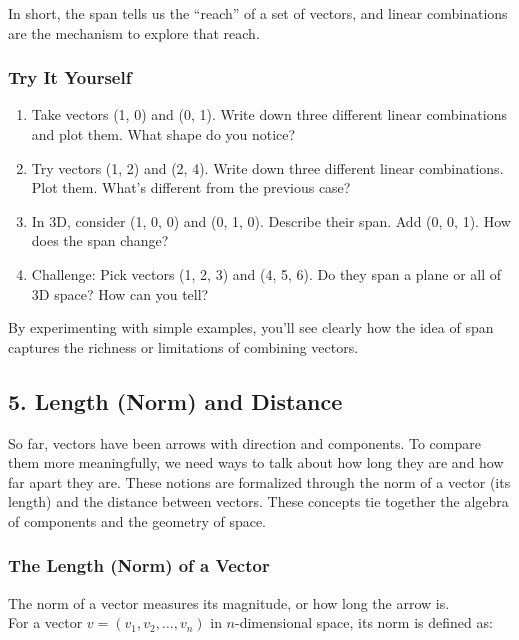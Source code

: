 \documentclass[
  letterpaper,
  DIV=11,
  numbers=noendperiod]{scrreprt}
\providecommand{\tightlist}{%
  \setlength{\itemsep}{0pt}\setlength{\parskip}{0pt}}
\begin{document}
In short, the span tells us the ``reach'' of a set of vectors, and
linear combinations are the mechanism to explore that reach.

\subsubsection{Try It Yourself}\label{try-it-yourself-3}

\begin{enumerate}
\def\labelenumi{\arabic{enumi}.}
\tightlist
\item
  Take vectors (1, 0) and (0, 1). Write down three different linear
  combinations and plot them. What shape do you notice?
\item
  Try vectors (1, 2) and (2, 4). Write down three different linear
  combinations. Plot them. What's different from the previous case?
\item
  In 3D, consider (1, 0, 0) and (0, 1, 0). Describe their span. Add (0,
  0, 1). How does the span change?
\item
  Challenge: Pick vectors (1, 2, 3) and (4, 5, 6). Do they span a plane
  or all of 3D space? How can you tell?
\end{enumerate}

By experimenting with simple examples, you'll see clearly how the idea
of span captures the richness or limitations of combining vectors.

\subsection{5. Length (Norm) and
Distance}\label{length-norm-and-distance}

So far, vectors have been arrows with direction and components. To
compare them more meaningfully, we need ways to talk about how long they
are and how far apart they are. These notions are formalized through the
norm of a vector (its length) and the distance between vectors. These
concepts tie together the algebra of components and the geometry of
space.

\subsubsection{The Length (Norm) of a
Vector}\label{the-length-norm-of-a-vector}

The norm of a vector measures its magnitude, or how long the arrow is.\\
For a vector \(v = (v_1, v_2, \ldots, v_n)\) in \(n\)-dimensional space,
its norm is defined as:
\end{document}
